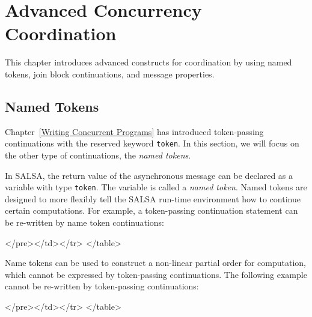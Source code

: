 \chapter{Advanced Concurrency Coordination}
\label{Advanced Concurrency Coordination}

This chapter introduces advanced constructs for coordination by using named tokens, 
join block continuations, and message properties. 

\section{Named Tokens}
\label{Named Tokens}
Chapter~\ref{Writing Concurrent Programs} has introduced token-passing 
continuations with the reserved keyword
{\tt token}. In this section, 
we will focus on the other type of continuations, 
the \textit{named tokens}.

In SALSA, the return value of the asynchronous message can be declared 
as a variable with type {\tt token}. The variable is 
called a \textit{named token}. Named tokens are designed to more flexibly tell 
the SALSA run-time environment how to continue certain computations.
For example, a token-passing continuation statement can be re-written by name token continuations:
{\singlespace

}
\begin{htmlonly}

 \begin{rawhtml} 
   </pre></td></tr>
  </table>
\end{rawhtml} 
\end{htmlonly}

Name tokens can be used to construct a non-linear partial order for computation,
which cannot be expressed by token-passing continuations.
The following example cannot be re-written by token-passing continuations:
{\singlespace

}
\begin{htmlonly}

 \begin{rawhtml} 
   </pre></td></tr>
  </table>
\end{rawhtml} 
\end{htmlonly}


